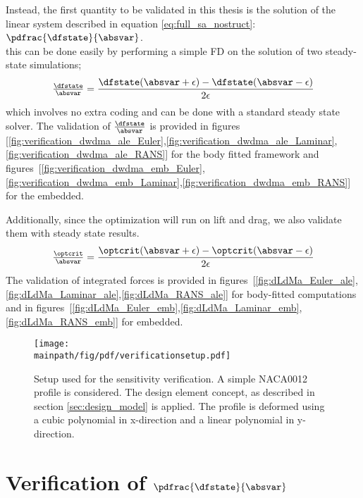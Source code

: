 \documentclass[../main.tex]{subfiles}
\begin{document}
Instead, the first quantity to be validated in this thesis is the solution of the linear system described in equation \eqref{eq:full_sa_nostruct}: $\pdfrac{\dfstate}{\absvar}$.\\
this can be done easily by performing a simple \ac{FD} on the solution of two steady-state simulations;
\begin{align}
\tfrac{\dfstate}{\absvar}=\frac{\dfstate(\absvar+\epsilon)-\dfstate(\absvar-\epsilon)}{2 \epsilon}
\end{align}
which involves no extra coding and can be done with a standard steady state solver.
The validation of $\tfrac{\dfstate}{\absvar}$ is provided in figures [\ref{fig:verification_dwdma_ale_Euler},\ref{fig:verification_dwdma_ale_Laminar},\ref{fig:verification_dwdma_ale_RANS}] for the body fitted framework and figures~[\ref{fig:verification_dwdma_emb_Euler},\ref{fig:verification_dwdma_emb_Laminar},\ref{fig:verification_dwdma_emb_RANS}] for the embedded.

Additionally, since the optimization will run on lift and drag, we also validate them with steady state results.
\begin{align}
\tfrac{\optcrit}{\absvar}=\frac{\optcrit(\absvar+\epsilon)-\optcrit(\absvar-\epsilon)}{2 \epsilon}
\end{align}
The validation of integrated forces is provided in figures~[\ref{fig:dLdMa_Euler_ale},\ref{fig:dLdMa_Laminar_ale},\ref{fig:dLdMa_RANS_ale}] for body-fitted computations and in figures~[\ref{fig:dLdMa_Euler_emb},\ref{fig:dLdMa_Laminar_emb},\ref{fig:dLdMa_RANS_emb}] for embedded.



\begin{figure}
\centering
\texttt{[image: \\mainpath/fig/pdf/verificationsetup.pdf]}
\caption[Verification setup]{Setup used for the sensitivity verification. A simple NACA0012 profile is considered. The design element concept, as described in section \ref{sec:design_model} is applied. The profile is deformed using a cubic polynomial in x-direction and a linear polynomial in y-direction.}
\label{fig:verification_setup}
\end{figure}

\section{Verification of $\pdfrac{\dfstate}{\absvar}$}\label{sec:verification_dwds}
\end{document}
